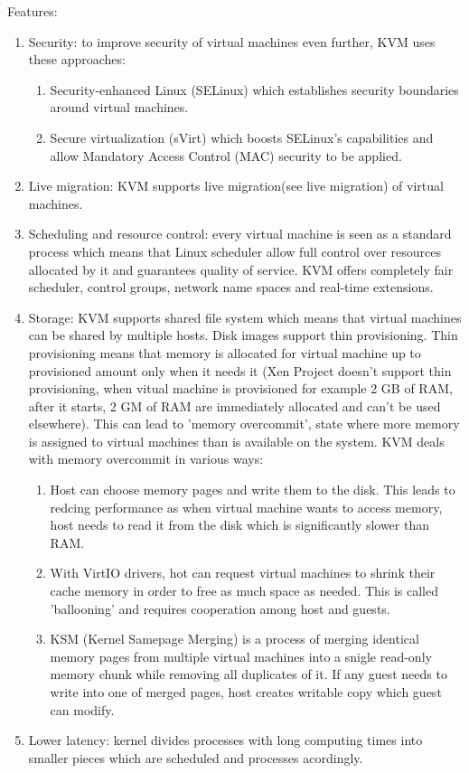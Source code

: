 \begin{itemize}
Features:
\begin{enumerate}
\item Security: to improve security of virtual machines even further, KVM uses these approaches:
\begin{enumerate}
\item Security-enhanced Linux (SELinux) which establishes security boundaries around virtual machines.
\item Secure virtualization (sVirt) which boosts SELinux's capabilities and allow Mandatory Access Control (MAC) security to be applied.
\end{enumerate}
\item Live migration: KVM supports live migration(see live migration) of virtual machines.
\item Scheduling and resource control: every virtual machine is seen as a standard process which means that Linux scheduler allow full control over resources allocated by it and guarantees quality of service. KVM offers completely fair scheduler, control groups, network name spaces and real-time extensions.
\item Storage: KVM supports shared file system which means that virtual machines can be shared by multiple hosts. Disk images support thin provisioning. Thin provisioning means that memory is allocated for virtual machine up to provisioned amount only when it needs it (Xen Project doesn't support thin provisioning, when vitual machine is provisioned for example 2 GB of RAM, after it starts, 2 GM of RAM are immediately allocated and can't be used elsewhere). This can lead to 'memory overcommit', state where more memory is assigned to virtual machines than is available on the system. KVM deals with memory overcommit in various ways:
\begin{enumerate}
\item Host can choose memory pages and write them to the disk. This leads to redcing performance as when virtual machine wants to access memory, host needs to read it from the disk which is significantly slower than RAM.
\item With VirtIO drivers, hot can request virtual machines to shrink their cache memory in order to free as much space as needed. This is called 'ballooning' and requires cooperation among host and guests.
\item KSM (Kernel Samepage Merging) is a process of merging identical memory pages from multiple virtual machines into a snigle read-only memory chunk while removing all duplicates of it. If any guest needs to write into one of merged pages, host creates writable copy which guest can modify.
\end{enumerate}
\item Lower latency: kernel divides processes with long computing times into smaller pieces which are scheduled and processes acordingly.
\end{enumerate}



\end{itemize}
